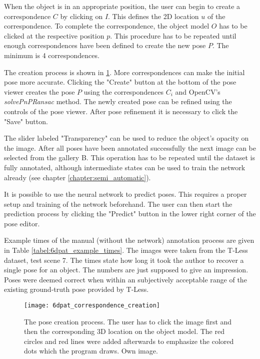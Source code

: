 When the object is in an appropriate position, the user can begin to create a correspondence $C$ by clicking on $I$. This defines the 2D location $u$ of the correspondence. To complete the correspondence, the object model $O$ has to be clicked at the respective position $p$. This procedure has to be repeated until enough correspondences have been defined to create the new pose $P$. The minimum is 4 correspondences. 

The creation process is shown in \fig \ref{fig:6dpat_correspondence_creation}. More correspondences can make the initial pose more accurate. Clicking the "Create" button at the bottom of the pose viewer creates the pose $P$ using the correspondences $C_i$ and OpenCV's \textit{solvePnPRansac} method. The newly created pose can be refined using the controls of the pose viewer. After pose refinement it is necessary to click the "Save" button. 

The slider labeled "Transparency" can be used to reduce the object's opacity on the image. After all poses have been annotated successfully the next image can be selected from the gallery B. This operation has to be repeated until the dataset is fully annotated, although intermediate states can be used to train the network already (see chapter \ref{chapter:semi_automatic}).

It is possible to use the neural network to predict poses. This requires a proper setup and training of the network beforehand. The user can then start the prediction process by clicking the "Predict" button in the lower right corner of the pose editor.

Example times of the manual (without the network) annotation process are given in Table \ref{tabel:6dpat_example_times}. The images were taken from the T-Less dataset, test scene 7. The times state how long it took the author to recover a single pose for an object. The numbers are just supposed to give an impression. Poses were deemed correct when within an subjectively acceptable range of the existing ground-truth pose provided by T-Less.

\begin{figure}[!tbp]
	\centering
    \texttt{[image: 6dpat\_correspondence\_creation]}
    \caption{The pose creation process. The user has to click the image first and then the corresponding 3D location on the object model. The red circles and red lines were added afterwards to emphasize the colored dots which the program draws. Own image.}
    \label{fig:6dpat_correspondence_creation}
\end{figure} 

